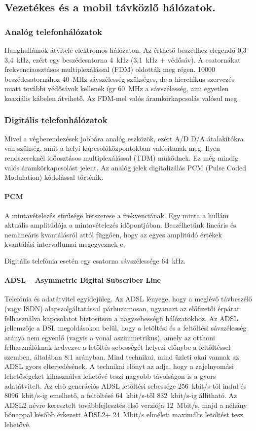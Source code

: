 \subsection{Vezetékes és a mobil távközlő hálózatok.}
\subsubsection{Analóg telefonhálózatok}
Hanghullámok átvitele elektromos hálózaton. Az érthető beszédhez elegendő 0,3-3,4~kHz, ezért egy beszédcsatorna 4~kHz (3,1~kHz + védősáv). A csatornákat frekvenciaosztásos multiplexálással (FDM) oldották meg régen. 10000 beszédcsatornához 40~MHz sávszélesség szükséges, de a hierchikus szervezés miatt további védősávok kellenek így 60~MHz a sávszélesség, ami egyetlen koaxiális kábelen átvihető. Az FDM-mel valós áramkörkapcsolás valósul meg.

\subsubsection{Digitális telefonhálózatok}
Mivel a végberendezések jobbára analóg eszközök, ezért A/D D/A átalakítókra van szükség, amit a helyi kapcsolóközpontokban valósítanak meg. Ilyen rendszereknél időosztásos multiplexálással (TDM) működnek. Ez még mindig valós áramkörkapcsolást jelent. Az analóg jelek digitalizálás PCM (Pulse Coded Modulation) kódolással történik.


\paragraph{PCM} A mintavételezés sűrűsége kétszerese a frekvenciának. Egy minta a hullám aktuális amplitúdója a mintavételezés időpontjában. Beszélhetünk lineáris és nemlineáris kvantálásról attól függően, hogy az egyes amplitúdó értékek kvantálási intervallumai megegyeznek-e.

Digitális telefónia esetén egy csatorna sávszélessége 64~kHz.

\paragraph{ADSL -- Asymmetric Digital Subscriber Line} Telefónia és adatátvitel egyidejűleg. Az ADSL lényege, hogy a meglévő távbeszélő (vagy ISDN) alapszolgáltatással párhuzamosan, ugyanazt az előfizetői érpárat felhasználva kapcsolatot biztosítson a nagysebességű hálózatokhoz.
Az ADSL jellemzője a DSL megoldásokon belül, hogy a letöltési és a feltöltési sávszélesség aránya nem egyenlő (vagyis a vonal aszimmetrikus), amely az otthoni felhasználóknak kedvezve a letöltés sebességét helyezi előnybe a feltöltéssel szemben, általában 8:1 arányban. Mind technikai, mind üzleti okai vannak az ADSL gyors elterjedésének. A technikai előnyt az adja, hogy a zajelnyomási lehetőségeket kihasználva lehetővé teszi nagyobb távolságon is a gyors adatátvitelt. Az első generációs ADSL letöltési sebessége 256~kbit/s-tól indul és 8096~kbit/s-ig emelhető, a feltöltésé 64~kbit/s-től 832~kbit/s-ig állítható. Az ADSL2 névre keresztelt továbbfejlesztés első verziója 12~Mbit/s, majd a néhány hónappal később érkezett ADSL2+ 24~Mbit/s elméleti maximális letöltést tesz lehetővé.

